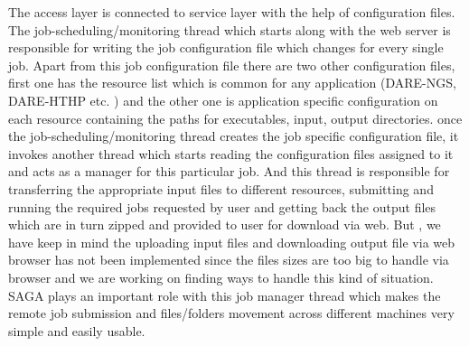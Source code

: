 \documentclass{sig-alternate}
\begin{document}
The access layer is connected to service layer with the help of configuration files. The job-scheduling/monitoring thread  which starts along with the web server is responsible for writing the job configuration file which changes for every single job. Apart from this job configuration file there are two other configuration files, first one has the resource list which is common for any application  (DARE-NGS, DARE-HTHP etc. ) and the other one is application specific configuration on each resource containing the paths for executables, input, output directories. once the job-scheduling/monitoring thread creates the job specific configuration file, it invokes another thread which starts reading the configuration files assigned to it and acts as a manager for this particular job. And this thread is responsible for transferring the appropriate input files to different resources, submitting and running the required jobs requested by user and getting back the output files which are in turn zipped and provided to user for download via web. But , we have keep in mind the uploading input files and downloading output file via web browser has not been implemented since the files sizes are too big to handle via browser and we are working on finding ways to handle this kind of situation. SAGA plays an important role with this job manager thread which makes the remote job submission and files/folders movement across different machines very simple and easily usable.
\end{document}
